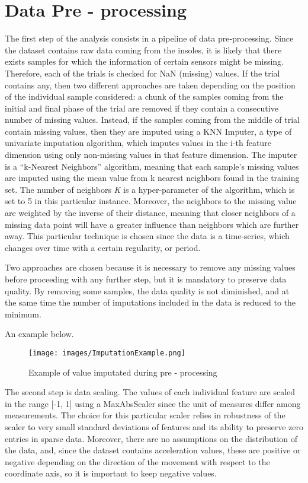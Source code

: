 \section{Data Pre - processing}
The first step of the analysis consists in a pipeline of data pre-processing. Since the dataset contains raw data coming from the insoles, it is likely that there exists samples for which the information of certain sensors might be missing. Therefore, each of the trials is checked for NaN (missing) values. 
If the trial contains any, then two different approaches are taken depending on the position of the individual sample considered: a chunk of the samples coming from the initial and final phase of the trial are removed if they contain a consecutive number of missing values. Instead, if the samples coming from the middle of trial contain missing values, then they are imputed using a KNN Imputer, a type of univariate imputation algorithm, which imputes values in the i-th feature dimension using only non-missing values in that feature dimension.
The imputer is a \enquote{k-Nearest Neighbors} algorithm, meaning that each sample’s missing values are imputed using the mean value from k nearest neighbors found in the training set.
The number of neighbors \textit{K} is a hyper-parameter of the algorithm, which is set to 5 in this particular instance. Moreover, the neighbors to the missing value are weighted by the inverse of their distance, meaning that closer neighbors of a missing data point will have a greater influence than neighbors which are further away. This particular technique is chosen since the data is a time-series, which changes over time with a certain regularity, or period.

Two approaches are chosen because it is necessary to remove any missing values before proceeding with any further step, but it is mandatory to preserve data quality. By removing some samples, the data quality is not diminished, and at the same time the number of imputations included in the data is reduced to the minimum.

An example below.
\begin{figure}[h!]
    \centering
    \texttt{[image: images/ImputationExample.png]}
    \caption{Example of value imputated during pre - processing}
    \label{fig:imputation}
\end{figure}


The second step is data scaling. The values of each individual feature are scaled in the range [-1, 1] using a MaxAbsScaler since the unit of measures differ among measurements. The choice for this particular scaler relies in robustness of the scaler to very small standard deviations of features and its ability to preserve zero entries in sparse data. Moreover, there are no assumptions on the distribution of the data, and, since the dataset contains acceleration values, these are positive or negative depending on the direction of the movement with respect to the coordinate axis, so it is important to keep negative values.

